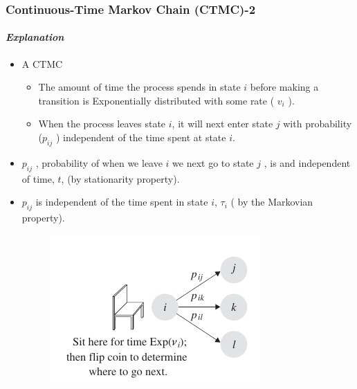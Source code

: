 \documentclass{beamer}
\begin{document}
\begin{frame} 
\frametitle{Continuous-Time Markov Chain (CTMC)-2 }
\framesubtitle{\textbf{\textit{Explanation}}}
\begin{itemize}

\item A CTMC 
\begin{itemize}
\item The amount of time the process spends in state $i$ before making a transition is
Exponentially distributed with some rate ( $v_i$ ).
\item  When the process leaves state $i$, it will next enter state $j$ with probability
($p_{ij}$ ) independent of the time spent at state $i$.
\end{itemize}

\item $p_{ij}$ ,  probability of  when we leave $i$ we next go to state $j$ , is and independent of time, $t$, (by stationarity property). 
\item $p_{ij}$ is independent of the time spent in state $i$, $\tau_i$ ( by the Markovian property).
\begin{figure}
        \begin{center}
		\includegraphics[scale=0.5]{images/ctmc.jpeg}
        \end{center}
		\end{figure}

\end{itemize}
	
\end{frame}
\end{document}
